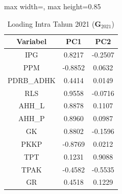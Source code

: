 \begin{table}[H]
\centering
\caption{Loading Intra Tahun 2021 ($\mathbf{G}_{2021}$)} \label{tab:loading_intra_2021}
\begin{adjustbox}{max width=\textwidth, max height=0.85\textheight}
\begin{tabular}{|c|c|c|}
\hline
\textbf{Variabel} & \textbf{PC1} & \textbf{PC2} \\
\hline
IPG & 0.8217 & -0.2507 \\
PPM & -0.8852 & 0.0632 \\
PDRB\_ADHK & 0.4414 & 0.0149 \\
RLS & 0.9558 & -0.0716 \\
AHH\_L & 0.8878 & 0.1107 \\
AHH\_P & 0.8960 & 0.0987 \\
GK & 0.8802 & -0.1596 \\
PKKP & -0.8769 & 0.0212 \\
TPT & 0.1231 & 0.9088 \\
TPAK & -0.4582 & -0.5535 \\
GR & 0.4518 & 0.1229 \\
\hline
\end{tabular}
\end{adjustbox}
\end{table}